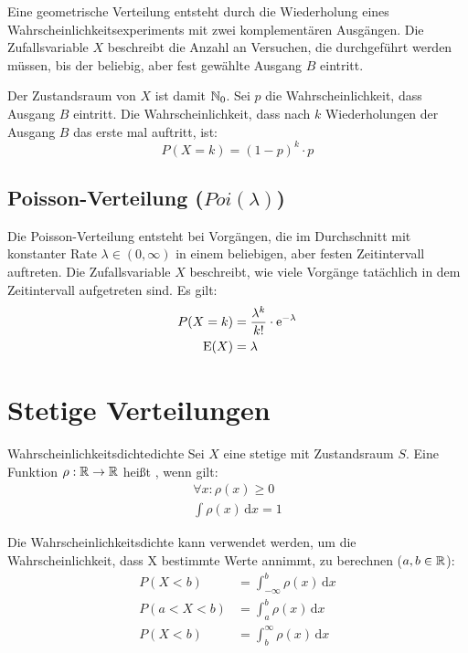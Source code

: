 Eine geometrische Verteilung entsteht durch die Wiederholung eines
Wahrscheinlichkeitsexperiments mit zwei komplementären Ausgängen. Die
Zufallsvariable $X$ beschreibt die Anzahl an Versuchen, die durchgeführt werden
müssen, bis der beliebig, aber fest gewählte Ausgang $B$ eintritt.

Der Zustandsraum von $X$ ist damit $\mathbb{N}_0$. Sei $p$ die Wahrscheinlichkeit, dass
Ausgang $B$ eintritt. Die Wahrscheinlichkeit, dass nach $k$ Wiederholungen der
Ausgang $B$ das erste mal auftritt, ist:
\[
P(X=k) = (1-p)^k\cdot p
\]

\subsection{Poisson-Verteilung ($Poi(\lambda)$)}

Die Poisson-Verteilung entsteht bei Vorgängen, die im Durchschnitt mit
konstanter Rate $\lambda \in (0, \infty)$ in einem beliebigen, aber
festen Zeitintervall auftreten. Die Zufallsvariable $X$ beschreibt, wie viele
Vorgänge tatächlich in dem Zeitintervall aufgetreten sind. Es gilt:
\begin{align*}
P(X=k) &= \frac{\lambda^k}{k!}\cdot\mathrm{e}^{-\lambda} \\
\operatorname{E}(X) &= \lambda
\end{align*}

\section{Stetige Verteilungen}

\begin{definition}{Wahrscheinlichkeitsdichte}{dichte}
Sei $X$ eine stetige  mit Zustandsraum $S$.
Eine Funktion $\rho: \mathbb{R} \rightarrow \mathbb{R}$ heißt ,
wenn gilt:
\begin{align*}
  \forall x: \rho(x) \ge 0 \\
  \int \rho(x) \,\mathrm{d}x = 1
\end{align*}
\end{definition}

Die Wahrscheinlichkeitsdichte kann verwendet werden, um die Wahrscheinlichkeit,
dass X bestimmte Werte annimmt, zu berechnen ($a,b\in\mathbb{R}$):
\begin{align*}
  P(X < b) &= \int_{-\infty}^{b}\rho(x)\,\mathrm{d}x\\
  P(a<X<b) &= \int_{a}^{b}\rho(x)\,\mathrm{d}x\\
  P(X < b) &= \int^{\infty}_{b}\rho(x)\,\mathrm{d}x
\end{align*}

